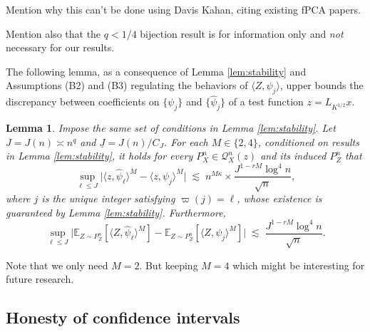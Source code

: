 \documentclass[11pt,a4paper]{article}
\renewcommand{\hat}{\widehat}
\theoremstyle{definition}
\theoremstyle{plain}
\newtheorem{lemma}{Lemma}[section]
\theoremstyle{remark}
\newcommand{\und}{\underline}
\begin{document}
{\color{red} Mention why this can't be done using Davis Kahan, citing existing fPCA papers.}

{\color{red} Mention also that the $q<1/4$ bijection result is for information only and \emph{not} necessary for our results.}


The following lemma, as a consequence of Lemma \ref{lem:stability} and Assumptions (B2) and (B3) regulating the behaviors of $\langle Z,\psi_j\rangle$,
upper bounds the discrepancy between coefficients on $\{\psi_j\}$ and $\{\hat\psi_j\}$ of a test function $z=L_{K^{1/2}}x$.
\begin{lemma}
Impose the same set of conditions in Lemma \ref{lem:stability}.
Let $J=J(n)\asymp n^q$ and $\und J=J(n)/C_J$.
For each $M\in\{2,4\}$, conditioned on results in Lemma \ref{lem:stability},
it holds for every $P_X^n\in\mathcal Q_X^n(z)$ and its induced $P_Z^n$ that
$$
\sup_{\ell\leq J}\big|\langle z,\hat\psi_\ell\rangle^M - \langle z,\psi_j\rangle^M\big|\; \lesssim\; n^{M\kappa}\times \frac{J^{1-rM}\log^4 n}{\sqrt{n}},
$$
where $j$ is the unique integer satisfying $\varpi(j)=\ell$, whose existence is guaranteed by Lemma \ref{lem:stability}.
Furthermore, 
$$
\sup_{\ell\leq J}\bigg|\mathbb E_{Z\sim P_Z^n}\left[\langle Z,\hat\psi_\ell\rangle^M\right] -\mathbb E_{Z\sim P_Z^n}\left[\langle Z,\psi_j\rangle^M\right]\bigg|
\;\lesssim\;\frac{J^{1-rM}\log^4 n}{\sqrt{n}}.
$$
\label{lem:zpsi-stability}
\end{lemma}

{\color{orange} Note that we only need $M=2$. But keeping $M=4$ which might be interesting for future research.}

\subsection{Honesty of confidence intervals}
\end{document}
